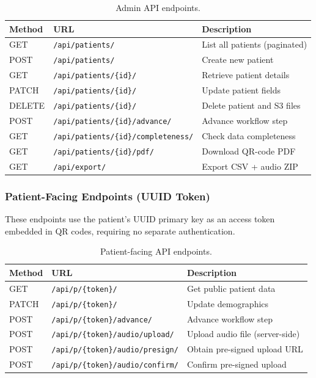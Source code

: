 \documentclass[12pt,a4paper]{article}
\begin{document}
\begin{table}[H]
\centering
\caption{Admin API endpoints.}
\label{tab:admin-api}
\begin{tabularx}{\textwidth}{l l X}
\toprule
\textbf{Method} & \textbf{URL} & \textbf{Description} \\
\midrule
GET    & \texttt{/api/patients/}                  & List all patients (paginated) \\
POST   & \texttt{/api/patients/}                  & Create new patient \\
GET    & \texttt{/api/patients/\{id\}/}            & Retrieve patient details \\
PATCH  & \texttt{/api/patients/\{id\}/}            & Update patient fields \\
DELETE & \texttt{/api/patients/\{id\}/}            & Delete patient and S3 files \\
POST   & \texttt{/api/patients/\{id\}/advance/}    & Advance workflow step \\
GET    & \texttt{/api/patients/\{id\}/completeness/} & Check data completeness \\
GET    & \texttt{/api/patients/\{id\}/pdf/}        & Download QR-code PDF \\
GET    & \texttt{/api/export/}                     & Export CSV + audio ZIP \\
\bottomrule
\end{tabularx}
\end{table}

\subsubsection{Patient-Facing Endpoints (UUID Token)}

These endpoints use the patient's UUID primary key as an access token embedded
in QR codes, requiring no separate authentication.

\begin{table}[H]
\centering
\caption{Patient-facing API endpoints.}
\label{tab:patient-api}
\begin{tabularx}{\textwidth}{l l X}
\toprule
\textbf{Method} & \textbf{URL} & \textbf{Description} \\
\midrule
GET  & \texttt{/api/p/\{token\}/}              & Get public patient data \\
PATCH & \texttt{/api/p/\{token\}/}             & Update demographics \\
POST & \texttt{/api/p/\{token\}/advance/}      & Advance workflow step \\
POST & \texttt{/api/p/\{token\}/audio/upload/}  & Upload audio file (server-side) \\
POST & \texttt{/api/p/\{token\}/audio/presign/} & Obtain pre-signed upload URL \\
POST & \texttt{/api/p/\{token\}/audio/confirm/} & Confirm pre-signed upload \\
\bottomrule
\end{tabularx}
\end{table}
\end{document}
